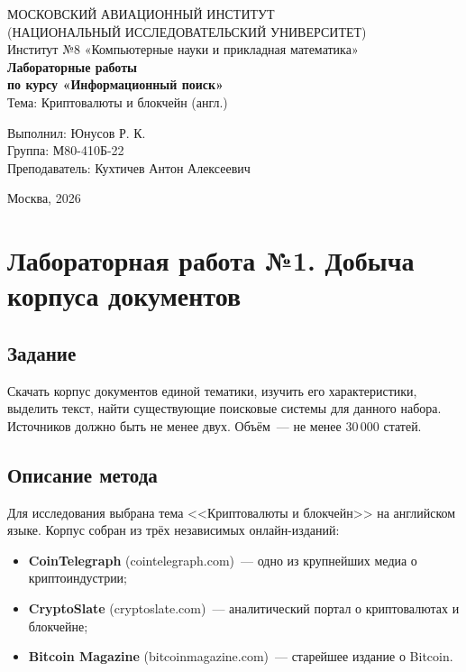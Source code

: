 \documentclass[12pt,a4paper]{article}
\begin{document}
\begin{titlepage}
    \centering
    {\fontsize{14pt}{16pt}\selectfont МОСКОВСКИЙ АВИАЦИОННЫЙ ИНСТИТУТ\\(НАЦИОНАЛЬНЫЙ ИССЛЕДОВАТЕЛЬСКИЙ УНИВЕРСИТЕТ)}\\[0.5cm]
    {\fontsize{12pt}{14pt}\selectfont Институт №8 «Компьютерные науки и прикладная математика»}\\[4cm]

    {\fontsize{16pt}{18pt}\selectfont \textbf{Лабораторные работы}}\\
    {\fontsize{14pt}{16pt}\selectfont \textbf{по курсу «Информационный поиск»}}\\[0.3cm]
    {\fontsize{12pt}{14pt}\selectfont Тема: Криптовалюты и блокчейн (англ.)}\\[4cm]

    \vfill
    \begin{flushright}
        \begin{minipage}{0.51\textwidth}
            Выполнил: Юнусов Р. К. \\
            Группа: М80-410Б-22\\
            Преподаватель: Кухтичев Антон Алексеевич
        \end{minipage}
    \end{flushright}

    \vfill
    {\large Москва, 2026}
\end{titlepage}

\tableofcontents
\newpage

\section{Лабораторная работа №1. Добыча корпуса документов}

\subsection{Задание}
Скачать корпус документов единой тематики, изучить его характеристики,
выделить текст, найти существующие поисковые системы для данного набора.
Источников должно быть не менее двух. Объём~--- не менее 30\,000 статей.

\subsection{Описание метода}
Для исследования выбрана тема <<Криптовалюты и блокчейн>> на английском языке.
Корпус собран из трёх независимых онлайн-изданий:
\begin{itemize}
    \item \textbf{CoinTelegraph} (cointelegraph.com)~--- одно из крупнейших медиа о криптоиндустрии;
    \item \textbf{CryptoSlate} (cryptoslate.com)~--- аналитический портал о криптовалютах и блокчейне;
    \item \textbf{Bitcoin Magazine} (bitcoinmagazine.com)~--- старейшее издание о Bitcoin.
\end{itemize}
\end{document}
